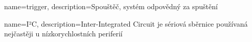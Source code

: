 {
    name=trigger,
    description={Spouštěč, systém odpovědný za spuštění }
}

{
    name=I²C,
    description={Inter-Integrated Circuit je sériová sběrnice používaná nejčastěji u
    nízkorychlostních periferií}
}